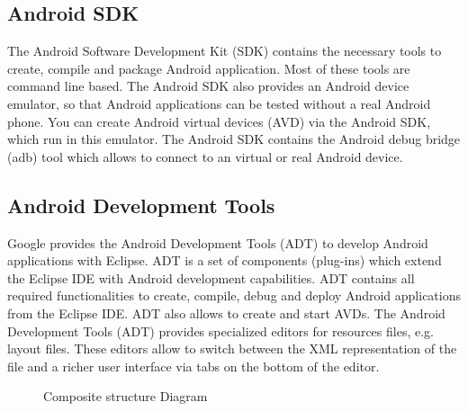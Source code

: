 \documentclass{SureshLimkar}
\begin{document}
\subsection{Android SDK}
\hspace{0.5 in} The Android Software Development Kit (SDK) contains the necessary tools to create, compile and package Android application. Most of these tools are command line based. The Android SDK also provides an Android device emulator, so that Android applications can be tested without a real Android phone. You can create Android virtual devices (AVD) via the Android SDK, which run in this emulator. The Android SDK contains the Android debug bridge (adb) tool which allows to connect to an virtual or real Android device.

\subsection{Android Development Tools}
\hspace{0.5 in}Google provides the Android Development Tools (ADT) to develop Android applications with Eclipse. ADT is a set of components (plug-ins) which extend the Eclipse IDE with Android development capabilities. ADT contains all required functionalities to create, compile, debug and deploy Android applications from the Eclipse IDE. ADT also allows to create and start AVDs.
The Android Development Tools (ADT) provides specialized editors for resources files, e.g. layout files. These editors allow to switch between the XML representation of the file and a richer user interface via tabs on the bottom of the editor.
\\  
\begin{figure}[h]%
\centering
{}%
\caption{Composite structure Diagram}%
\label{Composite Structure Diagram}%
\end{figure}
\newpage
\end{document}
